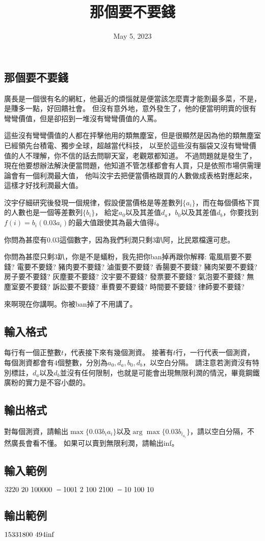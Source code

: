 \documentclass{article}
\title{那個要不要錢}
\date{May 5, 2023}
\begin{document}
\begin{CJK*}{UTF8}{bsmi}

\maketitle

\section*{那個要不要錢}
廣長是一個很有名的網紅，他最近的煩惱就是便當該怎麼賣才能割最多菜，不是，是賺多一點，好回饋社會。
但沒有意外地，意外發生了，他的便當明明賣的很有彎彎價值，但是卻招到一堆沒有彎彎價值的人罵。

這些沒有彎彎價值的人都在抨擊他用的類無塵室，但是很顯然是因為他的類無塵室已經領先台積電、獨步全球，超越當代科技，
以至於這些沒有腦袋又沒有彎彎價值的人不理解，你不信的話去問聊天室，老觀眾都知道。
不過問題就是發生了，現在他要想辦法解決便當問題，他知道不管怎樣都會有人買，只是依照市場供需理論會有一個利潤最大值，
他叫洨宇去把便當價格跟買的人數做成表格對應起來，這樣才好找利潤最大值。

洨宇仔細研究後發現一個規律，假設便當價格是等差數列$\{a_i\}$，而在每個價格下買的人數也是一個等差數列$\{b_i\}$，
給定$a_0$以及其差值$d_a$，$b_0$以及其差值$d_b$，你要找到$f(i)=b_i(0.03a_i)$的最大值跟使其為最大值得$i$。

你問為甚麼有$0.03$這個數字，因為我們利潤只剩$3$趴阿，比民眾檔還可悲。

你問為甚麼只剩$3$趴，你是不是蟻粉，我先把你ban掉再跟你解釋:
電風扇要不要錢? 電要不要錢? 豬肉要不要錢? 滷蛋要不要錢? 香腸要不要錢? 豬肉架要不要錢? 房子要不要錢? 灰塵要不要錢? 
洨宇要不要錢? 發票要不要錢? 氣泡要不要錢? 無塵室要不要錢? 訴訟要不要錢? 車費要不要錢? 時間要不要錢? 律師要不要錢?

來啊現在你講啊。你被ban掉了不用講了。

\subsection*{輸入格式}
每行有一個正整數$t$，代表接下來有幾個測資。
接著有$t$行，一行代表一個測資，每個測資都會有$4$個整數，分別為$a_0,d_a,b_0,d_b$，以空白分隔。
請注意若測資沒有特別標註，$d_a$以及$d_b$並沒有任何限制，也就是可能會出現無限利潤的情況，畢竟鋼鐵廣粉的實力是不容小覷的。

\subsection*{輸出格式}
對每個測資，請輸出$\max\{0.03b_ia_i\}$以及$\arg\max\{0.03b_i_a_i\}$，請以空白分隔，不然廣長會看不懂。
如果可以賣到無限利潤，請輸出inf。

\subsection*{輸入範例}
$3\\220\ 20\ 100000\ -100\\1\ 2\ 100\ 2\\100\ -10\ 100\ 10$

\subsection*{輸出範例}
$15331800\ 494\\\text{inf}\\$

\end{CJK*}
\end{document}
